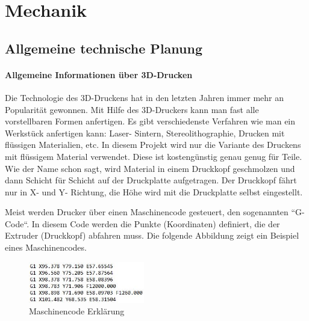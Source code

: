 \chapter{Mechanik}

\renewcommand{\kapitelautor}{Autor: Alexander Punz}

\section{Allgemeine technische Planung}

		\subsubsection{Allgemeine Informationen über 3D-Drucken}

		Die Technologie des 3D-Druckens hat in den letzten Jahren immer mehr an Popularität gewonnen.
		Mit Hilfe des 3D-Druckers kann man fast alle vorstellbaren Formen anfertigen.
		Es gibt verschiedenste Verfahren wie man ein Werkstück anfertigen kann: Laser- Sintern, Stereolithographie, Drucken mit flüssigen Materialien, etc.
		In diesem Projekt wird nur die Variante des Druckens mit flüssigem Material verwendet.
		Diese ist kostengünstig \bzw genau genug für Teile. Wie der Name schon sagt, wird Material in einem Druckkopf geschmolzen und dann Schicht für Schicht auf der Druckplatte aufgetragen.
		Der Druckkopf fährt nur in X- und Y- Richtung, die Höhe wird mit die Druckplatte selbst eingestellt.

		Meist werden Drucker über einen Maschinencode gesteuert, den sogenannten “G-Code“. In diesem Code werden die Punkte (Koordinaten) definiert, die der Extruder (Druckkopf) abfahren muss.
		Die folgende Abbildung zeigt ein Beispiel eines Maschinencodes.

			\begin{figure}[tbh]
			\begin{centering}
			\includegraphics[width = 0.45\textwidth]{Bilder/gcode_erklaerung}
			\par\end{centering}
			\caption{Maschinencode Erklärung}
			\label{gcode_erklaerung}
			\end{figure}

